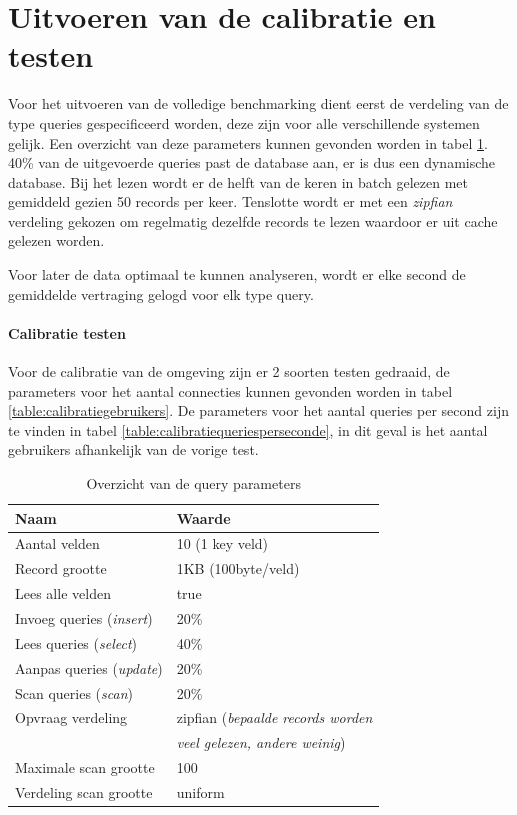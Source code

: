 \section{Uitvoeren van de calibratie en testen}
Voor het uitvoeren van de volledige benchmarking dient eerst de verdeling van de type queries gespecificeerd worden, deze zijn voor alle verschillende systemen gelijk. Een overzicht van deze parameters kunnen gevonden worden in tabel \ref{table:calibratiequeries}. 40\% van de uitgevoerde queries past de database aan, er is dus een dynamische database. Bij het lezen wordt er de helft van de keren in batch gelezen met gemiddeld gezien 50 records per keer. Tenslotte wordt er met een \textit{zipfian} verdeling gekozen om regelmatig dezelfde records te lezen waardoor er uit cache gelezen worden. 

Voor later de data optimaal te kunnen analyseren, wordt er elke second de gemiddelde vertraging gelogd voor elk type query. 

\paragraph{Calibratie testen} Voor de calibratie van de omgeving zijn er 2 soorten testen gedraaid, de parameters voor het aantal connecties kunnen gevonden worden in tabel \ref{table:calibratiegebruikers}. De parameters voor het aantal queries per second zijn te vinden in tabel \ref{table:calibratiequeriesperseconde}, in dit geval is het aantal gebruikers afhankelijk van de vorige test. 

\begin{table}[htb!]
	\centering
	\begin{tabular}{l| l }
	\textbf{Naam} & \textbf{Waarde} \\
	\hline
	Aantal velden & 10 (1 key veld) \\
	Record grootte & 1KB (100byte/veld) \\
	Lees alle velden & true \\
	Invoeg queries (\textit{insert}) & 20\%\\
	Lees queries (\textit{select}) & 40\%\\
	Aanpas queries (\textit{update}) & 20\%\\
	Scan queries (\textit{scan}) & 20\%\\
	Opvraag verdeling & zipfian (\textit{bepaalde records worden} \\
	& \textit{veel gelezen, andere weinig}) \\
	Maximale scan grootte & 100 \\
	Verdeling scan grootte & uniform \\
	\end{tabular}
	\caption{Overzicht van de query parameters}
	\label{table:calibratiequeries}
\end{table}

